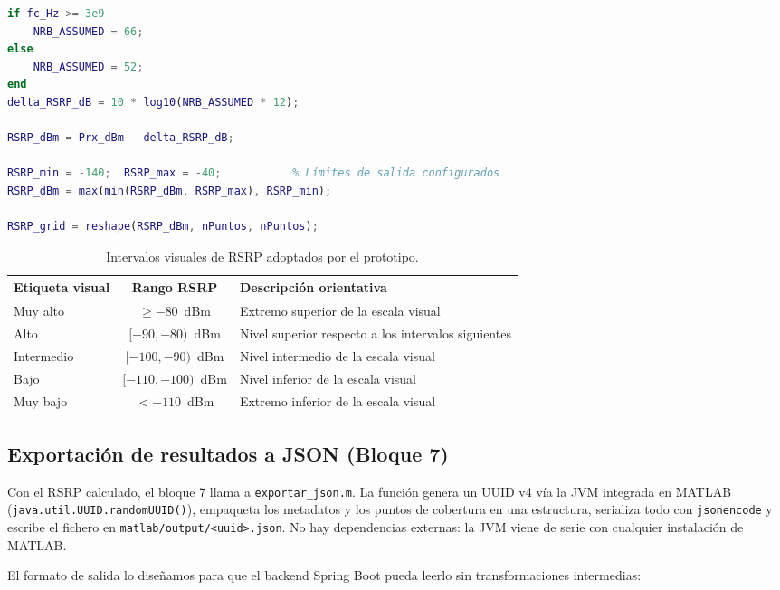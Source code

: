 \begin{lstlisting}[language=MATLAB, caption={Cálculo del RSRP a partir de $P_{rx}$ (Bloque 5).}, label={cod:bloque5}]
if fc_Hz >= 3e9
    NRB_ASSUMED = 66;
else
    NRB_ASSUMED = 52;
end
delta_RSRP_dB = 10 * log10(NRB_ASSUMED * 12);

RSRP_dBm = Prx_dBm - delta_RSRP_dB;

RSRP_min = -140;  RSRP_max = -40;           % Límites de salida configurados
RSRP_dBm = max(min(RSRP_dBm, RSRP_max), RSRP_min);

RSRP_grid = reshape(RSRP_dBm, nPuntos, nPuntos);
\end{lstlisting}

\begin{table}[H]
\centering
\caption{Intervalos visuales de RSRP adoptados por el prototipo.}
\label{tab:rsrp_umbrales}
\begin{tabular}{|l|c|l|}
\hline
\textbf{Etiqueta visual} & \textbf{Rango RSRP} & \textbf{Descripción orientativa} \\
\hline
Muy alto      & $\geq -80$~dBm          & Extremo superior de la escala visual \\
Alto          & $[-90, -80)$~dBm        & Nivel superior respecto a los intervalos siguientes \\
Intermedio    & $[-100, -90)$~dBm       & Nivel intermedio de la escala visual \\
Bajo          & $[-110, -100)$~dBm      & Nivel inferior de la escala visual \\
Muy bajo      & $< -110$~dBm            & Extremo inferior de la escala visual \\
\hline
\end{tabular}
\end{table}

\subsection{Exportación de resultados a JSON (Bloque 7)}
\label{sec:matlab_json}

Con el RSRP calculado, el bloque 7 llama a \texttt{exportar\_json.m}. La función genera
un UUID v4 vía la JVM integrada en MATLAB (\texttt{java.util.UUID.randomUUID()}), empaqueta
los metadatos y los puntos de cobertura en una estructura, serializa todo con
\texttt{jsonencode} y escribe el fichero en \texttt{matlab/output/<uuid>.json}. No hay
dependencias externas: la JVM viene de serie con cualquier instalación de MATLAB.

El formato de salida lo diseñamos para que el backend Spring Boot pueda leerlo sin
transformaciones intermedias:

